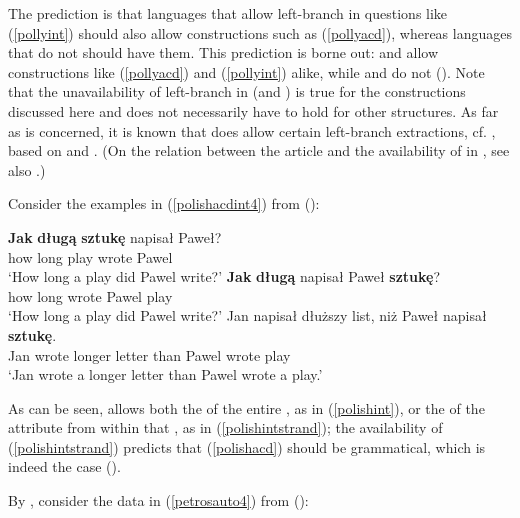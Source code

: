 The prediction is that languages that allow left-branch  in questions like (\ref{pollyint}) should also allow constructions such as (\ref{pollyacd}), whereas languages that do not should have them. This prediction is borne out:  and  allow constructions like (\ref{pollyacd}) and (\ref{pollyint}) alike, while  and  do not (\citealt[104--109]{kennedymerchant2000}). Note that the unavailability of left-branch  in  (and ) is true for the constructions discussed here and does not necessarily have to hold for other structures. As far as  is concerned, it is known that  does allow certain left-branch extractions, cf. \citet[281]{uriagereka2006}, based on \citet{corver1992} and \citet{horrocksstavrou1987}. (On the relation between the article and the availability of  in , see also \citealt{boskovic2005, boskovic2012}.)

Consider the examples in (\ref{polishacdint4}) from  (\citealt[104, exx. 29 and 31a]{kennedymerchant2000}):

\ea \label{polishacdint4}
\ea \gll \textbf{Jak} \textbf{d\l{}ug\k{a}} \textbf{sztuk\k{e}} napisa\l{} Pawe\l{}? \label{polishint}\\ 
how long play wrote Pawel\\
\glt `How long a play did Pawel write?'
\ex \gll \textbf{Jak} \textbf{d\l{}ug\k{a}} napisa\l{} Pawe\l{} \textbf{sztuk\k{e}}? \label{polishintstrand}\\
how long wrote Pawel play\\
\glt `How long a play did Pawel write?'
\ex \gll Jan napisa\l{} d\l{}u\.{z}szy list, ni\.{z} Pawe\l{} napisa\l{} \textbf{sztuk\k{e}}. \label{polishacd}\\
Jan wrote longer letter than Pawel wrote play\\
\glt `Jan wrote a longer letter than Pawel wrote a play.'
\z
\z

As can be seen,  allows both the  of the entire , as in (\ref{polishint}), or the  of the  attribute from within that , as in (\ref{polishintstrand}); the availability of (\ref{polishintstrand}) predicts that (\ref{polishacd}) should be grammatical, which is indeed the case (\citealt[104]{kennedymerchant2000}).

By , consider the data in (\ref{petrosauto4}) from  (\citealt[106--107, exx. 35 and 37a]{kennedymerchant2000}):

